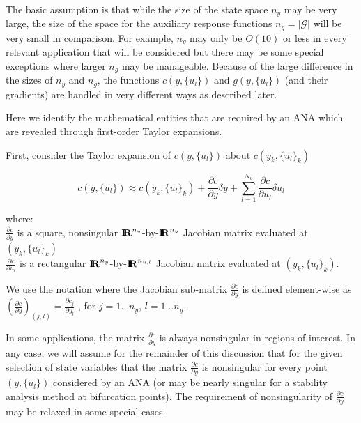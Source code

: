 The basic assumption is that while the size of the state space $n_y$
may be very large, the size of the space for the auxiliary response
functions $n_g = |\mathcal{G}|$ will be very small in comparison.  For
example, $n_g$ may only be $O(10)$ or less in every relevant
application that will be considered but there may be some special
exceptions where larger $n_g$ may be manageable.  Because of the large
difference in the sizes of $n_y$ and $n_g$, the functions
$c(y,\{u_l\})$ and $g(y,\{u_l\})$ (and their gradients) are handled in
very different ways as described later.

Here we identify the mathematical entities that are required by an ANA
which are revealed through first-order Taylor expansions.

First, consider the Taylor expansion of $c(y,\{u_l\})$ about
$c(y_k,\{u_l\}_k)$

\begin{equation}
c(y,\{u_l\}) \approx c(y_k,\{u_l\}_k) + \frac{\partial c}{\partial y} \delta y
+ \sum_{l=1}^{N_u} \frac{\partial c}{\partial u_l} \delta u_l
\label{tsfcorenonlin:equ:c_taylor}
\end{equation}
\begin{tabbing}
\hspace{4ex}where:\hspace{5ex}\= \\
\>	$\frac{\partial c}{\partial y}$ is a square, nonsingular $\mbox{\textbf{I}}\hspace{-0.6ex}\mbox{\textbf{R}}^{n_y}$-by-$\mbox{\textbf{I}}\hspace{-0.6ex}\mbox{\textbf{R}}^{n_y}$ Jacobian matrix
	evaluated at $(y_k,\{u_l\}_k)$\\
\>	$\frac{\partial c}{\partial u_l}$ is a rectangular $\mbox{\textbf{I}}\hspace{-0.6ex}\mbox{\textbf{R}}^{n_y}$-by-$\mbox{\textbf{I}}\hspace{-0.6ex}\mbox{\textbf{R}}^{n_{u,l}}$ Jacobian matrix
	evaluated at $(y_k,\{u_l\}_k)$.
\end{tabbing}

We use the notation where the Jacobian sub-matrix $\frac{\partial
c}{\partial y}$ is defined element-wise as $\left( \frac{\partial
c}{\partial y} \right)_{(j,l)} = \frac{\partial c_j}{\partial y_l}$ ,
for $j = 1 \ldots n_y$, $l = 1 \ldots n_y$.

In some applications, the matrix $\frac{\partial c}{\partial y}$ is
always nonsingular in regions of interest.  In any case, we will
assume for the remainder of this discussion that for the given
selection of state variables that the matrix $\frac{\partial
c}{\partial y}$ is nonsingular for every point $(y,\{u_l\})$
considered by an ANA (or may be nearly singular for a stability
analysis method at bifurcation points).  The requirement of
nonsingularity of $\frac{\partial c}{\partial y}$ may be relaxed in
some special cases.

